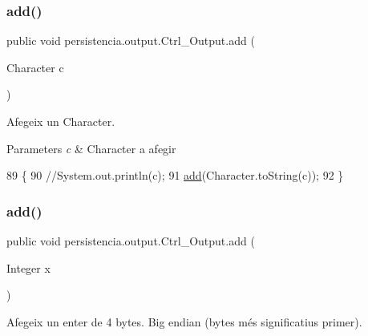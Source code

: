 \subsubsection{\texorpdfstring{add()}{add()}\hspace{0.1cm}{\footnotesize\ttfamily [3/6]}}
{\footnotesize\ttfamily public void persistencia.\+output.\+Ctrl\+\_\+\+Output.\+add (\begin{DoxyParamCaption}\item[{Character}]{c }\end{DoxyParamCaption})\hspace{0.3cm}{\ttfamily [inline]}}



Afegeix un Character. 


\begin{DoxyParams}{Parameters}
{\em c} & Character a afegir \\
\hline
\end{DoxyParams}

\begin{DoxyCode}
89                                  \{
90         \textcolor{comment}{//System.out.println(c);}
91         \hyperlink{classpersistencia_1_1output_1_1Ctrl__Output_a8c5aa5a6acb5259faeb1c05c71ddd21c}{add}(Character.toString(c));
92     \}
\end{DoxyCode}
\mbox{\label{classpersistencia_1_1output_1_1Ctrl__Output_aefe249b0ae9dbe578c44d96c6b56cf5d}} 
\subsubsection{\texorpdfstring{add()}{add()}\hspace{0.1cm}{\footnotesize\ttfamily [4/6]}}
{\footnotesize\ttfamily public void persistencia.\+output.\+Ctrl\+\_\+\+Output.\+add (\begin{DoxyParamCaption}\item[{Integer}]{x }\end{DoxyParamCaption})\hspace{0.3cm}{\ttfamily [inline]}}



Afegeix un enter de 4 bytes. Big endian (bytes més significatius primer). 



